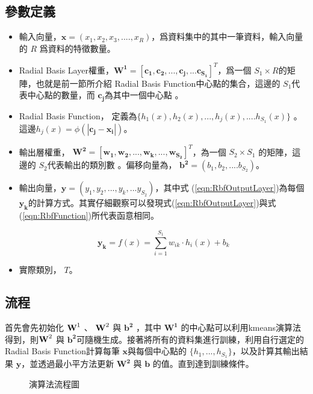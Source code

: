 \subsection{參數定義}
\begin{itemize}
	\item
	      輸入向量，\(\mathbf{x} = (x_1,x_2,x_3,....,x_R)\)，爲資料集中的其中一筆資料，輸入向量的 \(R\) 爲資料的特徵數量。
	\item
	      Radial Basis Layer權重，\(\mathbf{W^1} = [\mathbf{c_1,c_2,...,c_j,...c_{S_1}}]^T\)，爲一個 \(S_1 \times R \)的矩陣，也就是前一節所介紹 Radial Basis Function中心點的集合，這邊的 \(S_1\)代表中心點的數量，而 \(\mathbf{c_j}\)為其中一個中心點 。
	\item
	      Radial Basis Function， 定義為\(\{h_1(x), h_2(x),...,h_j(x),....h_{S_1}(x) \}\)  。
	      這邊$h_j(x)=\phi(\mathbf{|c_j-x_i|})$。


	\item
	      輸出層權重， \(\mathbf{W^2}= [\mathbf{w_1,w_2,...,w_k,...,w_{S_2}}]^T\)，為一個 \(S_2 \times S_1\) 的矩陣，這邊的 \(S_2\)代表輸出的類別數 。偏移向量為， \(\mathbf{b^2}=(b_1,b_2,....b_{S_2})\)。
	\item
	      輸出向量，\(\mathbf{y}= (y_1,y_2,...,y_k,...y_{S_2})\)，其中式 (\ref{eqn:RbfOutputLayer})為每個 \(\mathbf{y_k}\)的計算方式。其實仔細觀察可以發現式(\ref{eqn:RbfOutputLayer})與式(\ref{eqn:RbfFunction})所代表函意相同。

	      \begin{equation}
		      \label{eqn:RbfOutputLayer}
		      \mathbf{y_k}= f(x) = \sum_{i=1}^{S_1}w_{ik}\cdot h_i(x)+b_k
	      \end{equation}
	\item
	      實際類別， \(T\)。
\end{itemize}

\subsection{流程}

首先會先初始化 \(\textbf W^1\)  、 \(\textbf W^2\) 與 \(\mathbf{b^2}\) ，其中 \(\mathbf{W^1}\) 的中心點可以利用kmeans演算法得到，則\(\textbf W^2\) 與 \(\mathbf{b^2}\)可隨機生成。接著將所有的資料集進行訓練，利用自行選定的Radial Basis Function計算每筆 \(\mathbf x\)與每個中心點的 \(\{h_1,...,h_{S_1}\}\)，以及計算其輸出結果 \(\mathbf{y}\)，並透過最小平方法更新 \(\mathbf{W^2}\) 與 \(\mathbf{b}\) 的值。直到達到訓練條件。

\begin{figure}[H]
	\centering
	
	\caption{演算法流程圖}
	\label{fig:AlogrithmWorkflow}
\end{figure}

